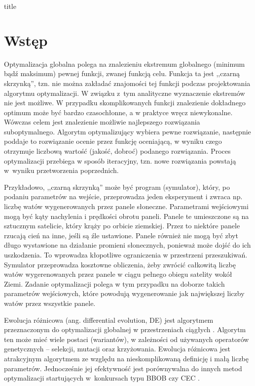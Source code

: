 \documentclass[a4paper,onecolumn,oneside,12pt,wide,floatssmall]{mwrep}
\theoremstyle{definition}
\theoremstyle{plain}%
\theoremstyle{remark}
\begin{document}
\renewcommand*\lstlistingname{Wydruk}
\renewcommand*\lstlistlistingname{Spis wydruków}

\renewcommand{\baselinestretch}{1.0}
\raggedbottom
 {title}

\tableofcontents

\newpage
{}
\setcounter{page}{1}

\chapter{Wstęp}

Optymalizacja globalna polega na znalezieniu ekstremum 
globalnego (minimum bądź maksimum) pewnej funkcji, zwanej funkcją celu. 
Funkcja ta jest ,,czarną skrzynką'', tzn. nie można
zakładać znajomości tej funkcji podczas projektowania algorytmu optymalizacji.
W związku z~tym analityczne wyznaczenie ekstremów nie jest możliwe. W przypadku 
skomplikowanych funkcji znalezienie dokładnego optimum może być bardzo czasochłonne, 
a w praktyce wręcz niewykonalne. Wówczas celem jest znalezienie możliwie najlepszego rozwiązania
suboptymalnego. Algorytm optymalizujący wybiera pewne rozwiązanie, następnie poddaje to rozwiązanie 
ocenie przez funkcję oceniającą, w wyniku czego otrzymuje liczbową wartość (jakość, dobroć) 
podanego rozwiązania. 
Proces optymalizacji przebiega w sposób iteracyjny, tzn. nowe rozwiązania powstają w~wyniku przetworzenia
poprzednich.

Przykładowo, ,,czarną skrzynką'' może być program (symulator), który, po podaniu 
parametrów na wejście, przeprowadza jeden eksperyment i zwraca np. liczbę watów wygenerowanych
przez panele słoneczne. Parametrami wejściowymi mogą być kąty nachylenia i prędkości obrotu paneli. 
Panele te umieszczone są na sztucznym satelicie, który krąży po orbicie ziemskiej.
Przez to niektóre panele rzucają cień na inne, jeśli są źle ustawione. Panele również nie mogą być 
zbyt długo wystawione na działanie promieni słonecznych, ponieważ może dojść do ich uszkodzenia. 
To wprowadza kłopotliwe ograniczenia w przestrzeni przeszukiwań.
Symulator przeprowadza kosztowne obliczenia, żeby zwrócić całkowitą liczbę watów wygerenowanych
przez panele w ciągu pełnego obiegu satelity wokół Ziemi. Zadanie optymalizacji polega w tym przypadku na
doborze takich parametrów wejściowych, które powodują wygenerowanie jak największej liczby watów
przez wszystkie panele.

Ewolucja różnicowa (ang. differential evolution, DE) jest algorytmem przeznaczonym 
do optymalizacji globalnej w przestrzeniach ciągłych \cite{storn}.
Algorytm ten może mieć wiele postaci (wariantów), w zależności od używanych
operatorów genetycznych -- selekcji, mutacji oraz krzyżowania. 
Ewolucja różnicowa jest atrakcyjnym algorytmem ze względu na nieskomplikowaną
definicję i małą liczbę parametrów. Jednocześnie jej efektywność jest porównywalna do innych metod
optymalizacji startujących w~konkursach typu BBOB \cite{setup} czy CEC \cite{cec}.
\end{document}
